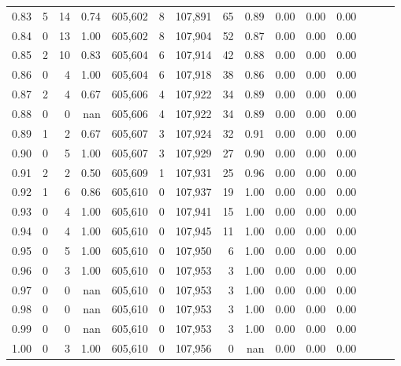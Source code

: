 \begin{tabular}{rrrrrrrrrrrrrrr}
0.83 &       5 &     14 &  0.74 &  605,602 &        8 &  107,891 &       65 &  0.89 &  0.00 &  0.00 &      0.00 \\
0.84 &       0 &     13 &  1.00 &  605,602 &        8 &  107,904 &       52 &  0.87 &  0.00 &  0.00 &      0.00 \\
0.85 &       2 &     10 &  0.83 &  605,604 &        6 &  107,914 &       42 &  0.88 &  0.00 &  0.00 &      0.00 \\
0.86 &       0 &      4 &  1.00 &  605,604 &        6 &  107,918 &       38 &  0.86 &  0.00 &  0.00 &      0.00 \\
0.87 &       2 &      4 &  0.67 &  605,606 &        4 &  107,922 &       34 &  0.89 &  0.00 &  0.00 &      0.00 \\
0.88 &       0 &      0 &   nan &  605,606 &        4 &  107,922 &       34 &  0.89 &  0.00 &  0.00 &      0.00 \\
0.89 &       1 &      2 &  0.67 &  605,607 &        3 &  107,924 &       32 &  0.91 &  0.00 &  0.00 &      0.00 \\
0.90 &       0 &      5 &  1.00 &  605,607 &        3 &  107,929 &       27 &  0.90 &  0.00 &  0.00 &      0.00 \\
0.91 &       2 &      2 &  0.50 &  605,609 &        1 &  107,931 &       25 &  0.96 &  0.00 &  0.00 &      0.00 \\
0.92 &       1 &      6 &  0.86 &  605,610 &        0 &  107,937 &       19 &  1.00 &  0.00 &  0.00 &      0.00 \\
0.93 &       0 &      4 &  1.00 &  605,610 &        0 &  107,941 &       15 &  1.00 &  0.00 &  0.00 &      0.00 \\
0.94 &       0 &      4 &  1.00 &  605,610 &        0 &  107,945 &       11 &  1.00 &  0.00 &  0.00 &      0.00 \\
0.95 &       0 &      5 &  1.00 &  605,610 &        0 &  107,950 &        6 &  1.00 &  0.00 &  0.00 &      0.00 \\
0.96 &       0 &      3 &  1.00 &  605,610 &        0 &  107,953 &        3 &  1.00 &  0.00 &  0.00 &      0.00 \\
0.97 &       0 &      0 &   nan &  605,610 &        0 &  107,953 &        3 &  1.00 &  0.00 &  0.00 &      0.00 \\
0.98 &       0 &      0 &   nan &  605,610 &        0 &  107,953 &        3 &  1.00 &  0.00 &  0.00 &      0.00 \\
0.99 &       0 &      0 &   nan &  605,610 &        0 &  107,953 &        3 &  1.00 &  0.00 &  0.00 &      0.00 \\
1.00 &       0 &      3 &  1.00 &  605,610 &        0 &  107,956 &        0 &   nan &  0.00 &  0.00 &      0.00 \\
\bottomrule
\end{tabular}
